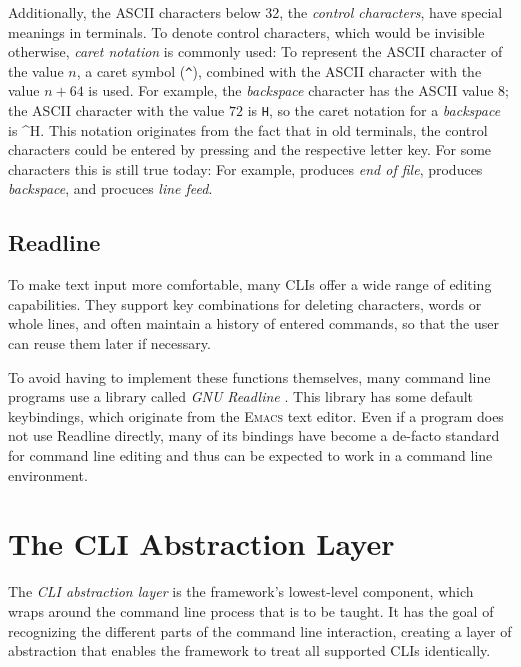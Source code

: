 \documentclass[paper=a4,twoside,abstract=on,cleardoublepage=empty,numbers=noenddot,toc=bib,toc=listof,12pt,appendixprefix=true]{scrreprt}
\newcommand{\escape}[1]{\textasciicircum #1}
\begin{document}
Additionally, the \textsc{ASCII} characters below 32, the \emph{control characters}, have special meanings in terminals.
To denote control characters, which would be invisible otherwise, \emph{caret notation} is commonly used: To represent the \textsc{ASCII} character of the value $n$, a caret symbol (\texttt{\textasciicircum}), combined with the \textsc{ASCII} character with the value $n+64$ is used. For example, the \emph{backspace} character has the \textsc{ASCII} value $8$; the \textsc{ASCII} character with the value $72$ is \texttt{H}, so the caret notation for a \emph{backspace} is \escape{H}. This notation originates from the fact that in old terminals, the control characters could be entered by pressing \keys{\ctrl} and the respective letter key. For some characters this is still true today: For example,  produces \emph{end of file},  produces \emph{backspace}, and  procuces \emph{line feed}.

\section{Readline}

To make text input more comfortable, many CLIs offer a wide range of editing capabilities. They support key combinations for deleting characters, words or whole lines, and often maintain a history of entered commands, so that the user can reuse them later if necessary.

To avoid having to implement these functions themselves, many command line programs use a library called \textsl{\textsc{GNU} Readline} \cite{readline}. This library has some default keybindings, which originate from the \textsc{Emacs} text editor. Even if a program does not use Readline directly, many of its bindings have become a de-facto standard for command line editing and thus can be expected to work in a command line environment.

\chapter{The \textsc{CLI} Abstraction Layer}
\label{sec:cliparser}

The \textsl{\textsc{CLI} abstraction layer} is the framework's lowest-level component, which wraps around the command line process that is to be taught. It has the goal of recognizing the different parts of the command line interaction, creating a layer of abstraction that enables the framework to treat all supported \textsc{CLI}s identically.
\end{document}
